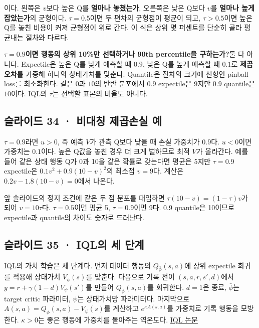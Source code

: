 \documentclass[11pt,a4paper]{article}
\begin{document}
이다. 왼쪽은 $v$보다 높은 Q를 \textbf{얼마나 놓쳤는가}, 오른쪽은 낮은 Q보다 $v$를 \textbf{얼마나 높게 잡았는가}의 균형이다. $\tau=0.5$이면 두 편차의 균형점이 평균이 되고, $\tau>0.5$이면 높은 Q를 놓친 비용이 커져 균형점이 위로 간다. 이 식은 상위 몇 퍼센트를 단순히 골라 평균내는 절차와 다르다.\par

\par\medskip\noindent\textbf{$\tau=0.9$이면 행동의 상위 10\%만 선택하거나 90th percentile을 구하는가?}\quad 둘 다 아니다. Expectile은 높은 Q를 낮게 예측할 때 $0.9$, 낮은 Q를 높게 예측할 때 $0.1$로 \textbf{제곱오차}를 가중해 하나의 상태가치를 맞춘다. Quantile은 잔차의 크기에 선형인 pinball loss를 최소화한다. 같은 $0$과 $10$의 반반 분포에서 $0.9$ expectile은 $9$지만 $0.9$ quantile은 $10$이다. IQL의 $\tau$는 선택할 표본의 비율도 아니다.\par

\subsection{슬라이드 34 · 비대칭 제곱손실 예}

$\tau=0.9$라면 $u>0$, 즉 예측 $V$가 관측 Q보다 낮을 때 손실 가중치가 $0.9$다. $u<0$이면 가중치는 $0.1$이다. 높은 Q값을 놓친 경우 더 크게 벌하므로 최적 $V$가 올라간다. 예를 들어 같은 상태 행동 Q가 0과 10을 같은 확률로 갖는다면 평균은 5지만 $\tau=0.9$ expectile은 $0.1v^2+0.9(10-v)^2$의 최소점 $v=9$다. 계산은 $0.2v-1.8(10-v)=0$에서 나온다.\par

앞 슬라이드의 정지 조건에 같은 두 점 분포를 대입하면 $\tau(10-v)=(1-\tau)v$가 되어 $v=10\tau$다. $\tau=0.5$이면 평균 5, $\tau=0.9$이면 9다. 0.9 quantile은 10이므로 expectile과 quantile의 차이도 숫자로 드러난다.\par

\subsection{슬라이드 35 · IQL의 세 단계}

IQL의 가치 학습은 세 단계다. 먼저 데이터 행동의 $Q_{\bar\phi}(s,a)$에 상위 expectile 회귀를 적용해 상태가치 $V_\psi(s)$를 맞춘다. 다음으로 기록 전이 $(s,a,r,s',d)$에서 $y=r+\gamma(1-d)V_\psi(s')$를 만들어 $Q_\phi(s,a)$를 회귀한다. $d=1$은 종료, $\bar\phi$는 target critic 파라미터, $\psi$는 상태가치망 파라미터다. 마지막으로 $A(s,a)=Q_\phi(s,a)-V_\psi(s)$를 계산하고 $e^{\kappa A(s,a)}$를 가중치로 기록 행동을 모방한다. $\kappa>0$는 좋은 행동에 가중치를 몰아주는 역온도다. \href{https://arxiv.org/abs/2110.06169}{IQL 논문}\par
\end{document}
